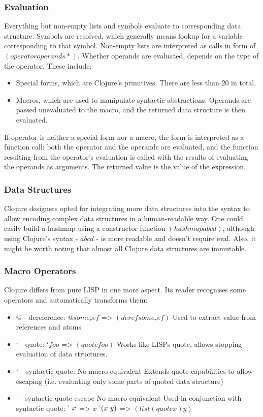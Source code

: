 \documentclass[11pt]{scrartcl}
\begin{document}
\subsubsection{Evaluation}
Everything but non-empty lists and symbols evaluate to corresponding data structure. Symbols are resolved, which generally means lookup for a variable corresponding to that symbol. Non-empty lists are interpreted as calls in form of $(operator operands*)$. Whether operands are evaluated, depends on the type of the operator. These include:
\begin{itemize}
  \item Special forms, which are Clojure’s primitives. There are  less than 20 in total.
  \item Macros, which are used to manipulate syntactic abstractions. Operands are passed unevaluated to the macro, and the returned data structure is then evaluated.
\end{itemize}
If operator is neither a special form nor a macro, the form is interpreted as a function call: both the operator and the operands are evaluated, and the function resulting from the operator’s evaluation is called with the results of evaluating the operands as arguments. The returned value is the value of the expression.
\subsubsection{Data Structures}
Clojure designers opted for integrating more data structures into the syntax to allow encoding complex data structures in a human-readable way. One could easily build a hashmap using a constructor function
$(hashmap a b c d)$, although using Clojure’s syntax - ${a b c d}$ - is more readable and doesn’t require eval. Also, it might be worth noting that almost all Clojure data structures are immutable.
\subsubsection{Macro Operators}
Clojure differs from pure LISP in one more aspect. Its reader recognises some operators and automatically transforms them:
\begin{itemize}
  \item $@$ - dereference:
$@some_ref$ => $(deref some_ref)$
Used to extract value from references and atoms
  \item $‘$ - quote:
$‘foo$ => $(quote foo)$
Works like LISPs quote, allows stopping evaluation of data structures.
  \item $`$ - syntactic quote:
No macro equivalent
Extends quote capabilities to allow escaping (i.e. evaluating only some parts of quoted data structure)
  \item $~$ - syntactic quote escape
No macro equivalent
Used in conjunction with syntactic quote:
$`~x$ => $x$
$`(x ~y)$ => $(list (quote x) y)$
\end{itemize}
\end{document}

